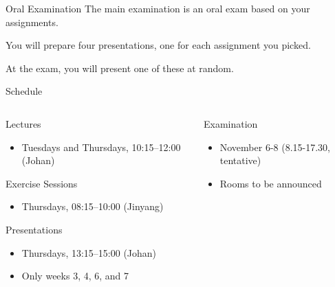\documentclass[
  ignorenonframetext,
  aspectratio=1610,
  onlytextwidth]{beamer}
\providecommand{\tightlist}{}
\begin{document}
\begin{frame}{Oral Examination}
\label{oral-examination}
The main examination is an oral exam based on your assignments.

\bigskip

\pause

You will prepare four presentations, one for each assignment you picked.

\bigskip

\pause

At the exam, you will present one of these at random.
\end{frame}

\begin{frame}{Schedule}
\label{schedule}
\begin{columns}[T]
\begin{column}{0.47\linewidth}
\begin{block}{Lectures}
\label{lectures}
\begin{itemize}
\tightlist
\item
  Tuesdays and Thursdays, 10:15--12:00 (Johan)
\end{itemize}

\pause
\end{block}

\begin{block}{Exercise Sessions}
\label{exercise-sessions}
\begin{itemize}
\tightlist
\item
  Thursdays, 08:15--10:00 (Jinyang)
\end{itemize}

\pause
\end{block}

\begin{block}{Presentations}
\label{presentations-1}
\begin{itemize}
\tightlist
\item
  Thursdays, 13:15--15:00 (Johan)
\item
  Only weeks 3, 4, 6, and 7
\end{itemize}
\end{block}
\end{column}

\pause

\begin{column}{0.47\linewidth}
\begin{block}{Examination}
\label{examination}
\begin{itemize}
\tightlist
\item
  November 6-8 (8.15-17.30, tentative)
\item
  Rooms to be announced
\end{itemize}
\end{block}
\end{column}
\end{columns}
\end{frame}
\end{document}
